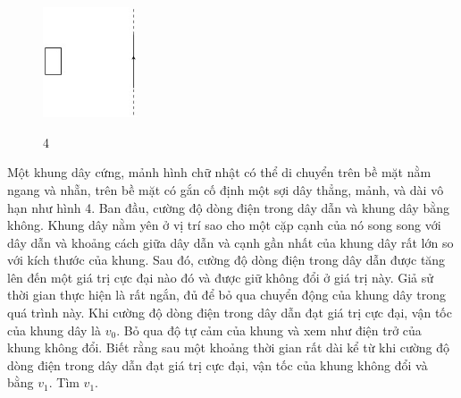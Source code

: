 \vspace{-1cm}
\begin{figure}
  \centering
  \includegraphics[width=0.25\textwidth]{Figures/Fig 4.jpg}
  \begin{center}
    \figurename{ 4}
  \end{center}
\end{figure}

\noindent Một khung dây cứng, mảnh hình chữ nhật có thể di chuyển trên bề mặt nằm ngang và nhẵn, trên bề mặt có gắn cố định một sợi dây thẳng, mảnh, và dài vô hạn như hình 4. Ban đầu, cường độ dòng điện trong dây dẫn và khung dây bằng không. Khung dây nằm yên ở vị trí sao cho một cặp cạnh của nó song song với dây dẫn và khoảng cách giữa dây dẫn và cạnh gần nhất của khung dây rất lớn so với kích thước của khung. Sau đó, cường độ dòng điện trong dây dẫn được tăng lên đến một giá trị cực đại nào đó và được giữ không đổi ở giá trị này. Giả sử thời gian thực hiện là rất ngắn, đủ để bỏ qua chuyển động của khung dây trong quá trình này. Khi cường độ dòng điện trong dây dẫn đạt giá trị cực đại, vận tốc của khung dây là $v_{0}$. Bỏ qua độ tự cảm của khung và xem như điện trở của khung không đổi. Biết rằng sau một khoảng thời gian rất dài kể từ khi cường độ dòng điện trong dây dẫn đạt giá trị cực đại, vận tốc của khung không đổi và bằng $v_{1}$. Tìm $v_{1}$.\\